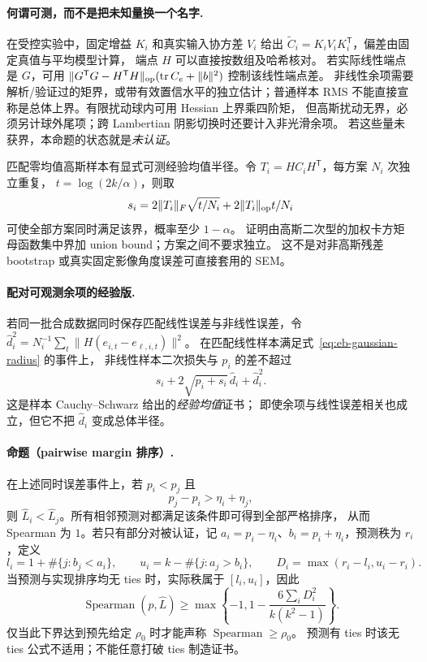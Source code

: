 \paragraph{何谓可测，而不是把未知量换一个名字.}
在受控实验中，固定增益 $K_i$ 和真实输入协方差 $V_i$ 给出
$\widetilde C_i=K_iV_iK_i^{\mathsf T}$，偏差由固定真值与平均模型计算，
端点 $H$ 可以直接按数组及哈希核对。
若实际线性端点是 $G$，可用
$\|G^{\mathsf T}G-H^{\mathsf T}H\|_{\rm op}
(\operatorname{tr}C_e+\|b\|^2)$ 控制该线性端点差。
非线性余项需要解析/验证过的矩界，或带有效置信水平的独立估计；普通样本 RMS
不能直接宣称是总体上界。有限扰动球内可用 Hessian 上界乘四阶矩，
但高斯扰动无界，必须另计球外尾项；跨 Lambertian 阴影切换时还要计入非光滑余项。
若这些量未获界，本命题的状态就是\emph{未认证}。

匹配零均值高斯样本有显式可测经验均值半径。令
$T_i=HC_iH^{\mathsf T}$，每方案 $N_i$ 次独立重复，
$t=\log(2k/\alpha)$，则取
\begin{equation}
 s_i=2\|T_i\|_F\sqrt{t/N_i}+2\|T_i\|_{\rm op}t/N_i
 \label{eq:eb-gaussian-radius}
\end{equation}
可使全部方案同时满足该界，概率至少 $1-\alpha$。
证明由高斯二次型的加权卡方矩母函数集中界加 union bound；方案之间不要求独立。
这不是对非高斯残差 bootstrap 或真实固定影像角度误差可直接套用的 SEM。

\paragraph{配对可观测余项的经验版.}
若同一批合成数据同时保存匹配线性误差与非线性误差，令
$\widehat d_i^2=N_i^{-1}\sum_t\|H(e_{i,t}-e_{\ell,i,t})\|^2$。
在匹配线性样本满足式~\eqref{eq:eb-gaussian-radius} 的事件上，
非线性样本二次损失与 $p_i$ 的差不超过
\begin{equation}
 s_i+2\sqrt{p_i+s_i}\,\widehat d_i+\widehat d_i^2.
 \label{eq:eb-paired-radius}
\end{equation}
这是样本 Cauchy--Schwarz 给出的\emph{经验均值}证书；
即使余项与线性误差相关也成立，但它不把 $\widehat d_i$ 变成总体半径。

\paragraph{命题（pairwise margin 排序）.}
在上述同时误差事件上，若 $p_i<p_j$ 且
\begin{equation}
 p_j-p_i>\eta_i+\eta_j,
 \label{eq:eb-margin}
\end{equation}
则 $\widehat L_i<\widehat L_j$。所有相邻预测对都满足该条件即可得到全部严格排序，
从而 Spearman 为 $1$。若只有部分对被认证，记
$a_i=p_i-\eta_i$、$b_i=p_i+\eta_i$，预测秩为 $r_i$，定义
\begin{equation}
 l_i=1+\#\{j:b_j<a_i\},\qquad
 u_i=k-\#\{j:a_j>b_i\},\qquad
 D_i=\max(r_i-l_i,u_i-r_i).
\end{equation}
当预测与实现排序均无 ties 时，实际秩属于 $[l_i,u_i]$，因此
\begin{equation}
 \operatorname{Spearman}(p,\widehat L)\ge
 \max\left\{-1,1-\frac{6\sum_iD_i^2}{k(k^2-1)}\right\}.
 \label{eq:eb-spearman}
\end{equation}
仅当此下界达到预先给定 $\rho_0$ 时才能声称 $\operatorname{Spearman}\ge\rho_0$。
预测有 ties 时该无 ties 公式不适用；不能任意打破 ties 制造证书。

